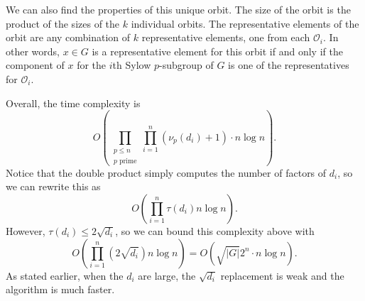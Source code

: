 \documentclass[11pt]{amsart}
\theoremstyle{definition}
\renewcommand{\phi}{\varphi}
\newcommand{\Aut}{\text{Aut}}
\newcommand{\setx}{\langle x \rangle}
\newcommand{\sety}{\langle y \rangle}
\renewcommand{\leq}{\leqslant}
\numberwithin{equation}{section}
\begin{document}
We can also find the properties of this unique orbit. The size of the orbit is the product of the sizes of the $k$ individual orbits. The representative elements of the orbit are any combination of $k$ representative elements, one from each $\mathcal{O}_i$. In other words, $x\in G$ is a representative element for this orbit if and only if the component of $x$ for the $i$th Sylow $p$-subgroup of $G$ is one of the representatives for $\mathcal{O}_i$.

Overall, the time complexity is \[O\left(\prod_{\substack{p \leq n\\ \text{$p$ prime}}} \prod_{i=1}^n (\nu_p(d_i) + 1)  \cdot n \log n\right).\] Notice that the double product simply computes the number of factors of $d_i$, so we can rewrite this as 
\[
O\left( \prod_{i=1}^n \tau(d_i) n \log n\right).
\]
However, $\tau(d_i) \leq 2\sqrt{d_i}$, so we can bound this complexity above with 
\[
O\left( \prod_{i=1}^n (2\sqrt{d_i}) n \log n\right) = O(\sqrt{|G|} 2^n \cdot n \log n).
\]
As stated earlier, when the $d_i$ are large, the $\sqrt{d_i}$ replacement is weak and the algorithm is much faster. 


\end{document}
